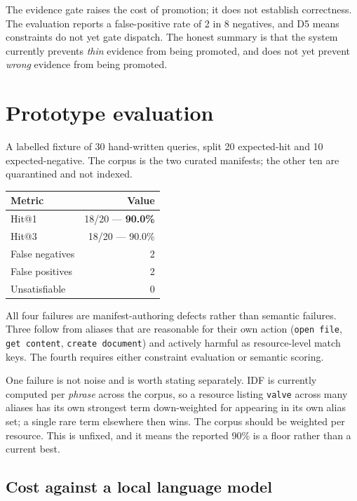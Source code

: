 \documentclass[11pt,twocolumn]{article}
\begin{document}
The evidence gate raises the cost of promotion; it does not establish
correctness. The evaluation reports a false-positive rate of 2 in 8 negatives,
and D5 means constraints do not yet gate dispatch. The honest summary is that
the system currently prevents \emph{thin} evidence from being promoted, and does
not yet prevent \emph{wrong} evidence from being promoted.

\section{Prototype evaluation}

A labelled fixture of 30 hand-written queries, split 20 expected-hit and 10
expected-negative. The corpus is the two curated manifests; the other ten are
quarantined and not indexed.

\begin{center}
\begin{tabular}{@{}lr@{}}
\toprule
\textbf{Metric} & \textbf{Value} \\
\midrule
Hit@1        & 18/20 --- \textbf{90.0\%} \\
Hit@3        & 18/20 --- 90.0\% \\
False negatives & 2 \\
False positives & 2 \\
Unsatisfiable  & 0 \\
\bottomrule
\end{tabular}
\end{center}

All four failures are manifest-authoring defects rather than semantic failures.
Three follow from aliases that are reasonable for their own action
(\texttt{open file}, \texttt{get content}, \texttt{create document}) and
actively harmful as resource-level match keys. The fourth requires either
constraint evaluation or semantic scoring.

One failure is not noise and is worth stating separately. IDF is currently
computed per \emph{phrase} across the corpus, so a resource listing
\texttt{valve} across many aliases has its own strongest term down-weighted for
appearing in its own alias set; a single rare term elsewhere then wins. The
corpus should be weighted per resource. This is unfixed, and it means the
reported 90\% is a floor rather than a current best.

\subsection{Cost against a local language model}
\end{document}

